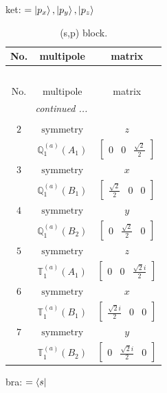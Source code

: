 \documentclass[fleqn,8pt,landscape]{jsarticle}
\begin{document}
\noindent
ket: $=\ket{p_{x}}, \ket{p_{y}}, \ket{p_{z}}$
\renewcommand{\arraystretch}{1.6}
\begin{longtable}{ccc}
\caption{(s,p) block.}
 \\
 \hline \hline
No. & multipole & matrix \\ \hline \endfirsthead

\multicolumn{2}{l}{\tablename\ \thetable{}} \\
 \hline \hline
No. & multipole & matrix \\ \hline \endhead

 \hline \hline
\multicolumn{2}{r}{\footnotesize\it continued ...} \\ \endfoot

 \hline \hline
\multicolumn{2}{r}{} \\ \endlastfoot

$ 2 $ & $ \text{symmetry} $ & $ z $ \\
$  $ & $ \mathbb{Q}_{1}^{(a)}(A_{1}) $ & $ \begin{bmatrix} 0 & 0 & \frac{\sqrt{2}}{2} \end{bmatrix} $ \\ \hline
$ 3 $ & $ \text{symmetry} $ & $ x $ \\
$  $ & $ \mathbb{Q}_{1}^{(a)}(B_{1}) $ & $ \begin{bmatrix} \frac{\sqrt{2}}{2} & 0 & 0 \end{bmatrix} $ \\ \hline
$ 4 $ & $ \text{symmetry} $ & $ y $ \\
$  $ & $ \mathbb{Q}_{1}^{(a)}(B_{2}) $ & $ \begin{bmatrix} 0 & \frac{\sqrt{2}}{2} & 0 \end{bmatrix} $ \\ \hline
$ 5 $ & $ \text{symmetry} $ & $ z $ \\
$  $ & $ \mathbb{T}_{1}^{(a)}(A_{1}) $ & $ \begin{bmatrix} 0 & 0 & \frac{\sqrt{2} i}{2} \end{bmatrix} $ \\ \hline
$ 6 $ & $ \text{symmetry} $ & $ x $ \\
$  $ & $ \mathbb{T}_{1}^{(a)}(B_{1}) $ & $ \begin{bmatrix} \frac{\sqrt{2} i}{2} & 0 & 0 \end{bmatrix} $ \\ \hline
$ 7 $ & $ \text{symmetry} $ & $ y $ \\
$  $ & $ \mathbb{T}_{1}^{(a)}(B_{2}) $ & $ \begin{bmatrix} 0 & \frac{\sqrt{2} i}{2} & 0 \end{bmatrix} $ \\ \hline
\end{longtable}
bra: $=\bra{s}$
\end{document}
